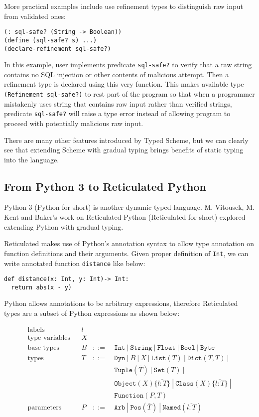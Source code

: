 More practical examples include use refinement types to distinguish raw input
from validated ones:

\begin{verbatim}
(: sql-safe? (String -> Boolean))
(define (sql-safe? s) ...)
(declare-refinement sql-safe?)
\end{verbatim}

In this example, user implements predicate \texttt{sql-safe?} to verify
that a raw string contains no SQL injection or other contents of malicious attempt.
Then a refinement type is declared using this very function.
This makes available type \texttt{(Refinement sql-safe?)} to rest part of the program
so that when a programmer mistakenly uses string that contains raw input rather than verified strings,
predicate \texttt{sql-safe?} will raise a type error instead of allowing program to proceed
with potentially malicious raw input.

There are many other features introduced by Typed Scheme,
but we can clearly see that extending Scheme with gradual typing
brings benefits of static typing into the language.

\subsection{From Python 3 to Reticulated Python}

Python 3 (Python for short) is another dynamic typed language.
M. Vitousek, M. Kent and Baker's work on Reticulated Python\cite{vitousek2014design}
(Reticulated for short)
explored extending Python with gradual typing.

Reticulated makes use of Python's annotation syntax\cite{pep3107}
to allow type annotation on function definitions and their arguments.
Given proper definition of \texttt{Int}, we can write annotated
function \texttt{distance} like below:

\begin{verbatim}
def distance(x: Int, y: Int)-> Int:
  return abs(x - y)
\end{verbatim}

Python allows annotations to be arbitrary expressions, therefore
Reticulated types are a subset of Python expressions as shown below:

\begin{align*}
\text{labels} && l & & \\
\text{type variables} && X & & \\
\text{base types} && B & ::=&
  \texttt{Int}\ |\ \texttt{String}\ |\ 
  \texttt{Float}\ |\ \texttt{Bool}\ |\ \texttt{Byte} \\
\text{types} && T & ::=\ &
  \texttt{Dyn}\ |\ B\ |\ X \ |\ 
   \texttt{List}(T)\ |\ \texttt{Dict}(T,T)\ |\\
   && & &\texttt{Tuple}(\overline{T})\ |\ \texttt{Set}(T)\ |\\
   && & &\texttt{Object}(X)\{\overline{l : T}\}\ |\ \texttt{Class}(X)\{\overline{l : T}\}\ |\\
   && & &\texttt{Function}(P,T)\\
\text{parameters} && P & ::= & \texttt{Arb}\ |\ \texttt{Pos}(\overline{T})\ 
  |\ \texttt{Named}(\overline{l : T})
\end{align*}

